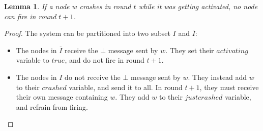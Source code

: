 \documentclass{article}
\newtheorem{lemma}{Lemma}
\begin{document}
\begin{lemma} \label{lem:no-fire-activating}
	If a node $w$ crashes in round $t$ while it was getting activated, no node can fire in round $t+1$.
\end{lemma}
\begin{proof}
	The system can be partitioned into two subset $I$ and $\overline{I}$:
	\begin{itemize}
		\item The nodes in $\overline{I}$ receive the $\bot$ message sent by $w$. They set their $activating$ variable to $true$, and do not fire in round $t+1$.
		\item The nodes in $I$ do not receive the $\bot$ message sent by $w$. They instead add $w$ to their $crashed$ variable, and send it to all.
			In round $t+1$, they must receive their own message containing $w$. They add $w$ to their $justcrashed$ variable, and refrain from firing.
	\end{itemize}
\end{proof}
\end{document}
